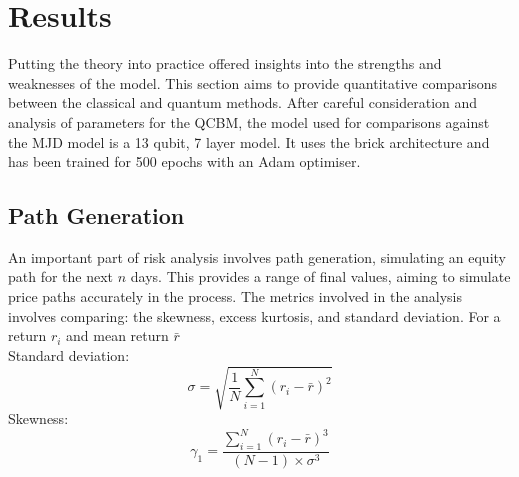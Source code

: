 \documentclass[12pt]{article}
\numberwithin{equation}{section}
\begin{document}
\newpage
\section{Results}
Putting the theory into practice offered insights into the strengths and weaknesses 
of the model. This section aims to provide quantitative comparisons between the 
classical and quantum methods. After careful consideration and analysis of parameters 
for the QCBM, the model used for comparisons against the MJD model is a 13 qubit,
7 layer model. It uses the brick architecture and has been trained for 500 epochs 
with an Adam optimiser. 
\subsection{Path Generation}
An important part of risk analysis involves path generation, simulating an equity 
path for the next $n$ days. This provides a range of final values, aiming to 
simulate price paths accurately in the process. The metrics involved in the analysis 
involves comparing: the skewness, excess kurtosis, and standard deviation. 
For a return $r_i$ and mean return $\bar{r}$ 
\\Standard deviation:
$$
\sigma = \sqrt{\frac{1}{N} \sum_{i=1}^{N} (r_i - \bar{r})^2}
$$
Skewness:
$$
\gamma_1 = \frac{\sum_{i=1}^{N} (r_i - \bar{r})^3}{(N-1) \times \sigma^3}
$$
\end{document}
